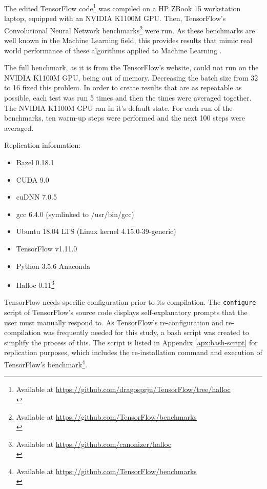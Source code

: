 \documentclass[12pt,twoside]{article}
\begin{document}
The edited TensorFlow code\footnote{Available at \url{https://github.com/dragosprju/TensorFlow/tree/halloc}\\} was compiled on a HP ZBook 15 workstation laptop, equipped with an NVIDIA K1100M GPU. Then, TensorFlow's Convolutional Neural Network benchmarks\footnote{Available at \url{https://github.com/TensorFlow/benchmarks}\\} were run. As these benchmarks are well known in the Machine Learning field, this provides results that mimic real world performance of these algorithms applied to Machine Learning \cite{abadi2016}. 

The full benchmark, as it is from the TensorFlow's website, could not run on the NVIDIA K1100M GPU, being out of memory. Decreasing the batch size from 32 to 16 fixed this problem. In order to create results that are as repeatable as possible, each test was run 5 times and then the times were averaged together. The NVIDIA K1100M GPU ran in it's default state. For each run of the benchmarks, ten warm-up steps were performed and the next 100 steps were averaged.


\vspace{10px}

Replication information:
\begin{itemize}
\vspace{-5px}
\itemsep-0.25em 
    \item Bazel 0.18.1
    \item CUDA 9.0
    \item cuDNN 7.0.5 %
    \item gcc 6.4.0 (symlinked to /usr/bin/gcc)
    \item Ubuntu 18.04 LTS (Linux kernel 4.15.0-39-generic)
    \item TensorFlow v1.11.0
    \item Python 3.5.6 Anaconda
    \item Halloc 0.11\footnote{Available at \url{https://github.com/canonizer/halloc}\\}
\end{itemize}

TensorFlow needs specific configuration prior to its compilation. The \texttt{configure} script of TensorFlow's source code displays self-explanatory prompts that the user must manually respond to. As TensorFlow's re-configuration and re-compilation was frequently needed for this study, a bash script was created to simplify the process of this. The script is listed in Appendix \ref{apx:bash-script} for replication purposes, which includes the re-installation command and execution of TensorFlow's benchmark\footnote{Available at \url{https://github.com/TensorFlow/benchmarks}\\}.
\end{document}
